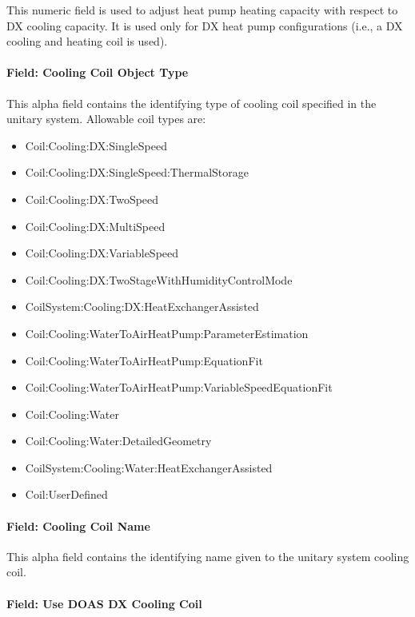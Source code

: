 This numeric field is used to adjust heat pump heating capacity with respect to DX cooling capacity. It is used only for DX heat pump configurations (i.e., a DX cooling and heating coil is used).

\paragraph{Field: Cooling Coil Object Type}\label{field-cooling-coil-object-type-002}

This alpha field contains the identifying type of cooling coil specified in the unitary system. Allowable coil types are:

\begin{itemize}
\item
  Coil:Cooling:DX:SingleSpeed
\item
  Coil:Cooling:DX:SingleSpeed:ThermalStorage
\item
  Coil:Cooling:DX:TwoSpeed
\item
  Coil:Cooling:DX:MultiSpeed
\item
  Coil:Cooling:DX:VariableSpeed
\item
  Coil:Cooling:DX:TwoStageWithHumidityControlMode
\item
  CoilSystem:Cooling:DX:HeatExchangerAssisted
\item
  Coil:Cooling:WaterToAirHeatPump:ParameterEstimation
\item
  Coil:Cooling:WaterToAirHeatPump:EquationFit
\item
  Coil:Cooling:WaterToAirHeatPump:VariableSpeedEquationFit
\item
  Coil:Cooling:Water
\item
  Coil:Cooling:Water:DetailedGeometry
\item
  CoilSystem:Cooling:Water:HeatExchangerAssisted
\item
  Coil:UserDefined
\end{itemize}

\paragraph{Field: Cooling Coil Name}\label{field-cooling-coil-name-002}

This alpha field contains the identifying name given to the unitary system cooling coil.

\paragraph{Field: Use DOAS DX Cooling Coil}\label{field-use-doas-dx-cooling-coil}

